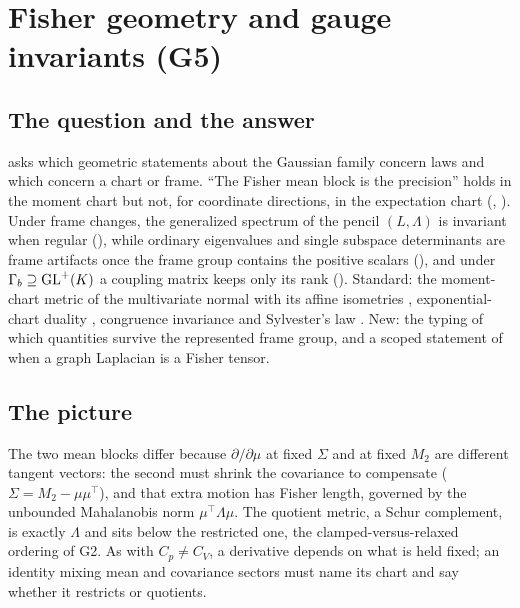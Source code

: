 \section{Fisher geometry and gauge invariants (G5)}
\label{comp:sg1-fisher}

\subsection{The question and the answer}

 asks which geometric statements about the Gaussian family concern laws and which
concern a chart or frame. ``The Fisher mean block is the precision'' holds in the moment chart but not,
for coordinate directions, in the expectation chart (,
). Under frame changes, the generalized spectrum of the pencil
\((L,\Lambda)\) is invariant when regular (), while ordinary eigenvalues
and single subspace determinants are frame artifacts once the frame group contains the positive scalars
(), and under \(\Gamma_b\supseteq\mathrm{GL}^+(K)\) a coupling
matrix keeps only its rank (). Standard: the moment-chart metric of the
multivariate normal \citep{Skovgaard1984} with its affine isometries \citep{PineleStrapassonCosta2020},
exponential-chart duality \citep{AmariNagaoka2000}, congruence invariance and Sylvester's law
\citep{HornJohnson2013}. New: the typing of which quantities survive the represented frame group, and a
scoped statement of when a graph Laplacian is a Fisher tensor.

\subsection{The picture}

The two mean blocks differ because \(\partial/\partial\mu\) at fixed \(\Sigma\) and at fixed \(M_2\) are
different tangent vectors: the second must shrink the covariance to compensate
(\(\Sigma=M_2-\mu\mu^\top\)), and that extra motion has Fisher length, governed by the unbounded
Mahalanobis norm \(\mu^\top\Lambda\mu\). The quotient metric, a Schur complement, is exactly \(\Lambda\)
and sits below the restricted one, the clamped-versus-relaxed ordering of G2. As with \(C_p\neq C_V\), a
derivative depends on what is held fixed; an identity mixing mean and covariance sectors must name its
chart and say whether it restricts or quotients.

